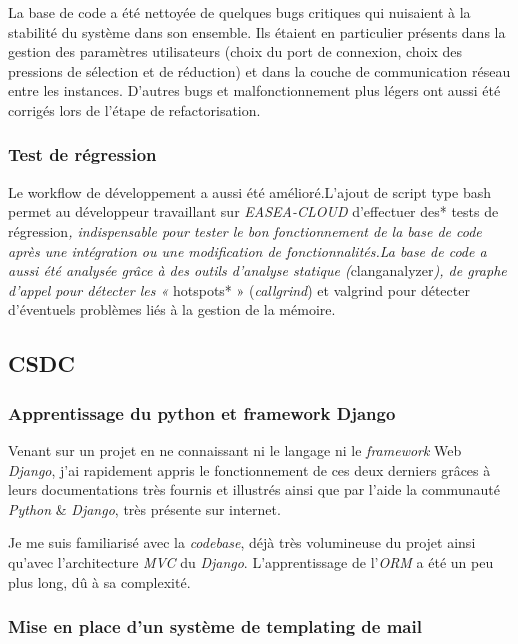 \documentclass[french, 11pt]{memoir}
\begin{document}
La base de code a été nettoyée de quelques bugs critiques qui nuisaient
à la stabilité du système dans son ensemble. Ils étaient en particulier
présents dans la gestion des paramètres utilisateurs (choix du port de
connexion, choix des pressions de sélection et de réduction) et dans la
couche de communication réseau entre les instances. D'autres bugs et
malfonctionnement plus légers ont aussi été corrigés lors de l'étape de
refactorisation.

\subsubsection{Test de régression}\label{test-de-ruxe9gression}

Le workflow de développement a aussi été amélioré.L'ajout de script type
bash permet au développeur travaillant sur \emph{EASEA-CLOUD}
d'effectuer des* tests de régression\emph{, indispensable pour tester le
	bon fonctionnement de la base de code après une intégration ou une
	modification de fonctionnalités.La base de code a aussi été analysée
	grâce à des outils d'analyse statique (}clanganalyzer\emph{), de graphe
	d'appel pour détecter les « }hotspots* » (\emph{callgrind}) et valgrind
pour détecter d'éventuels problèmes liés à la gestion de la mémoire.

\subsection{CSDC}\label{csdc-1}

\subsubsection{Apprentissage du python et framework
	Django}\label{apprentissage-du-python-et-framework-django}

Venant sur un projet en ne connaissant ni le langage ni le
\emph{framework} Web \emph{Django}, j'ai rapidement appris le
fonctionnement de ces deux derniers grâces à leurs documentations très
fournis et illustrés ainsi que par l'aide la communauté \emph{Python} \&
\emph{Django}, très présente sur internet.

Je me suis familiarisé avec la \emph{codebase}, déjà très volumineuse du
projet ainsi qu'avec l'architecture \emph{MVC }du \emph{Django}.
L'apprentissage de l'\emph{ORM} a été un peu plus long, dû à sa
complexité.

\subsubsection{Mise en place d'un système de templating de
	mail}\label{mise-en-place-dun-systuxe8me-de-templating-de-mail}
\end{document}
